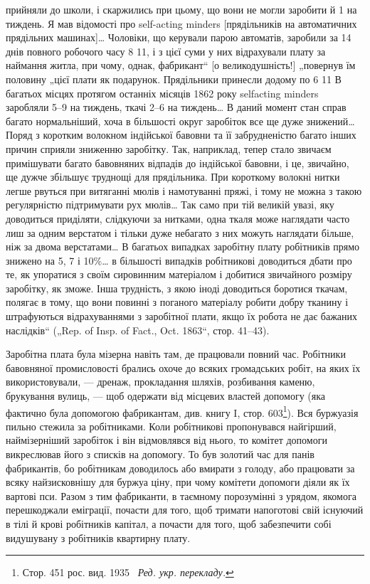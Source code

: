 \parcont{}  %
прийняли до школи, і скаржились при цьому, що вони не могли
заробити й 1 на тиждень. Я мав відомості про self-acting
minders [прядільників на автоматичних прядільних машинах]\dots{}
Чоловіки, що керували парою автоматів, заробили за 14 днів
повного робочого часу 8 11, і з цієї суми у них відрахували
плату за наймання житла, при чому, однак, фабрикант“
[о великодушність!] „повернув їм половину „цієї плати як
подарунок. Прядільники принесли додому по 6 11
В багатьох місцях протягом останніх місяців 1862 року selfacting
minders заробляли 5--9 на тиждень, ткачі 2--6
на тиждень\dots{} В даний момент стан справ багато нормальніший,
хоча в більшості округ заробіток все ще дуже знижений\dots{}
Поряд з коротким волокном індійської бавовни та її забрудненістю
багато інших причин сприяли зниженню заробітку. Так,
наприклад, тепер стало звичаєм примішувати багато бавовняних
відпадів до індійської бавовни, і це, звичайно, ще дужче збільшує
труднощі для прядільника. При короткому волокні нитки
легше рвуться при витяганні мюлів і намотуванні пряжі, і тому
не можна з такою регулярністю підтримувати рух мюлів\dots{} Так
само при тій великій увазі, яку доводиться приділяти, слідкуючи
за нитками, одна ткаля може наглядати часто лиш за одним верстатом
і тільки дуже небагато з них можуть наглядати більше,
ніж за двома верстатами\dots{} В багатьох випадках заробітну плату
робітників прямо знижено на 5, 7 і 10\%\dots{} в більшості випадків
робітникові доводиться дбати про те, як упоратися з своїм сировинним
матеріалом і добитися звичайного розміру заробітку, як
зможе. Інша трудність, з якою іноді доводиться боротися ткачам,
полягає в тому, що вони повинні з поганого матеріалу робити
добру тканину і штрафуються відрахуваннями з заробітної
плати, якщо їх робота не дає бажаних наслідків“ („Rep. of Insp.
of Fact., Oct. 1863“, стор. 41--43).

Заробітна плата була мізерна навіть там, де працювали повний
час. Робітники бавовняної промисловості брались охоче до всяких
громадських робіт, на яких їх використовували, — дренаж, прокладання
шляхів, розбивання каменю, брукування вулиць, — щоб
одержати від місцевих властей допомогу (яка фактично була допомогою
фабрикантам, див. книгу I, стор. 603\footnote*{Стор. 451 рос. вид. 1935~ \emph{Ред. укр. перекладу.}}). Вся буржуазія
пильно стежила за робітниками. Коли робітникові пропонувався
найгірший, наймізерніший заробіток і він відмовлявся від нього,
то комітет допомоги викреслював його з списків на допомогу. То
був золотий час для панів фабрикантів, бо робітникам доводилось
або вмирати з голоду, або працювати за всяку найзисковнішу
для буржуа ціну, при чому комітети допомоги діяли як
їх вартові пси. Разом з тим фабриканти, в таємному порозумінні
з урядом, якомога перешкоджали еміграції, почасти для
того, щоб тримати напоготові свій існуючий в тілі й крові робітників
капітал, а почасти для того, щоб забезпечити собі видушувану
з робітників квартирну плату.

